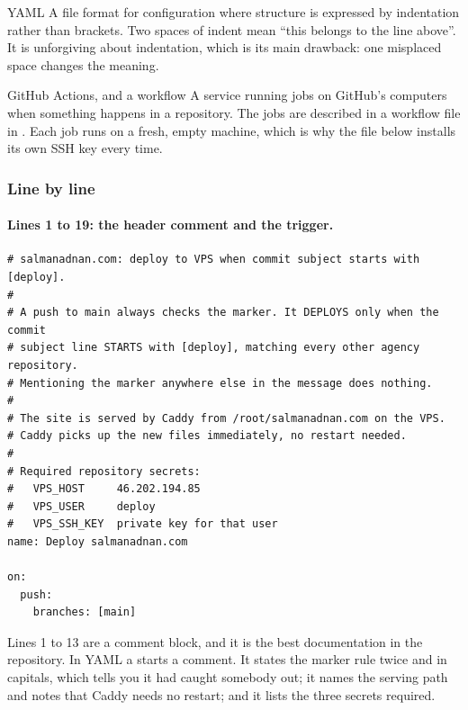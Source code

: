 \begin{jargon}{YAML}
A file format for configuration where structure is expressed by indentation rather
than brackets. Two spaces of indent mean ``this belongs to the line above''. It is
unforgiving about indentation, which is its main drawback: one misplaced space
changes the meaning.
\end{jargon}

\begin{jargon}{GitHub Actions, and a workflow}
A service running jobs on GitHub's computers when something happens in a
repository. The jobs are described in a workflow file in .
Each job runs on a fresh, empty machine, which is why the file below installs its
own SSH key every time.
\end{jargon}

\subsubsection*{Line by line}

\paragraph{Lines 1 to 19: the header comment and the trigger.}

\begin{lstlisting}[firstnumber=1,caption={\file{deploy.yml.disabled}, lines 1--19}]
# salmanadnan.com: deploy to VPS when commit subject starts with [deploy].
#
# A push to main always checks the marker. It DEPLOYS only when the commit
# subject line STARTS with [deploy], matching every other agency repository.
# Mentioning the marker anywhere else in the message does nothing.
#
# The site is served by Caddy from /root/salmanadnan.com on the VPS.
# Caddy picks up the new files immediately, no restart needed.
#
# Required repository secrets:
#   VPS_HOST     46.202.194.85
#   VPS_USER     deploy
#   VPS_SSH_KEY  private key for that user
name: Deploy salmanadnan.com

on:
  push:
    branches: [main]

\end{lstlisting}

Lines 1 to 13 are a comment block, and it is the best documentation in the
repository. In YAML a \code{\#} starts a comment. It states the marker rule twice
and in capitals, which tells you it had caught somebody out; it names the serving
path and notes that Caddy needs no restart; and it lists the three secrets required.

